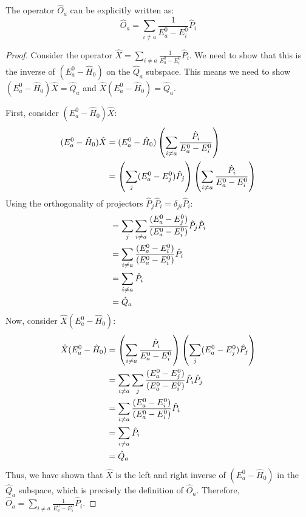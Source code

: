 \begin{lemma}
  The operator $\hat O_a$ can be explicitly written as:
  \begin{equation} \label{eq:kato_operator_O_a_sum_form}
    \hat O_a = \sum_{i \ne a}\frac{1}{E_a^0 - E_i^0} \hat P_i
  \end{equation}
\end{lemma}
\begin{proof}
  Consider the operator $\hat X = \sum_{i \ne a}\frac{1}{E_a^0 -
  E_i^0} \hat P_i$. We need to show that this is the inverse of
  $(E^0_a - \hat H_0)$ on the $\hat Q_a$ subspace. This means we
  need to show $(E^0_a - \hat H_0) \hat X = \hat Q_a$ and $\hat X
  (E^0_a - \hat H_0) = \hat Q_a$.

  First, consider $(E^0_a - \hat H_0) \hat X$:
  \begin{align} \label{eq:O_a_inverse_proof1}
    (E^0_a - \hat H_0) \hat X &= (E_a^0 - \hat H_0) \left(
    \sum_{i \ne a} \frac{\hat P_i}{E_a^0 - E_i^0} \right) \\
    &= \left( \sum_{j} (E_a^0 - E_j^0) \hat P_j \right) \left(
    \sum_{i \ne a} \frac{\hat P_i}{E_a^0 - E_i^0} \right) \notag
  \end{align}
  Using the orthogonality of projectors $\hat P_j \hat P_i =
  \delta_{ji} \hat P_i$:
  \begin{align}
    &= \sum_{j} \sum_{i \ne a} \frac{(E_a^0 - E_j^0)}{(E_a^0 -
    E_i^0)} \hat P_j \hat P_i \notag \\
    &= \sum_{i \ne a} \frac{(E_a^0 - E_i^0)}{(E_a^0 - E_i^0)}
    \hat P_i \notag \\
    &= \sum_{i \ne a} \hat P_i \notag \\
    &= \hat Q_a \notag
  \end{align}
  Now, consider $\hat X (E^0_a - \hat H_0)$:
  \begin{align} \label{eq:O_a_inverse_proof2}
    \hat X (E^0_a - \hat H_0) &=  \left( \sum_{i \ne a}
    \frac{\hat P_i}{E_a^0 - E_i^0} \right) \left( \sum_{j} (E_a^0
    - E_j^0) \hat P_j \right) \\
    &= \sum_{i \ne a} \sum_{j} \frac{(E_a^0 - E_j^0)}{(E_a^0 -
    E_i^0)} \hat P_i \hat P_j \notag \\
    &= \sum_{i \ne a} \frac{(E_a^0 - E_i^0)}{(E_a^0 - E_i^0)}
    \hat P_i \notag \\
    &= \sum_{i \ne a} \hat P_i \notag \\
    &= \hat Q_a \notag
  \end{align}
  Thus, we have shown that $\hat X$ is the left and right inverse
  of $(E^0_a - \hat H_0)$ in the $\hat Q_a$ subspace, which is
  precisely the definition of $\hat O_a$. Therefore, $\hat O_a =
  \sum_{i \ne a}\frac{1}{E_a^0 - E_i^0} \hat P_i$.
\end{proof}

